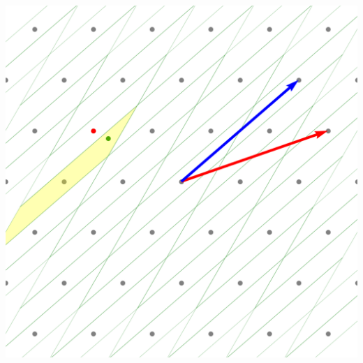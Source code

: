 \documentclass[
aspectratio=169, %
t, %
onlytextwidth, %
10pt, %
]{beamer}
\begin{document}
\begin{frame}
\begin{columns}[T]
\begin{column}{0.48\linewidth}
                \includegraphics[width=\linewidth]{cvp_bad_basis.png}
            \end{column}
        \end{columns}
\end{frame}

\end{document}

